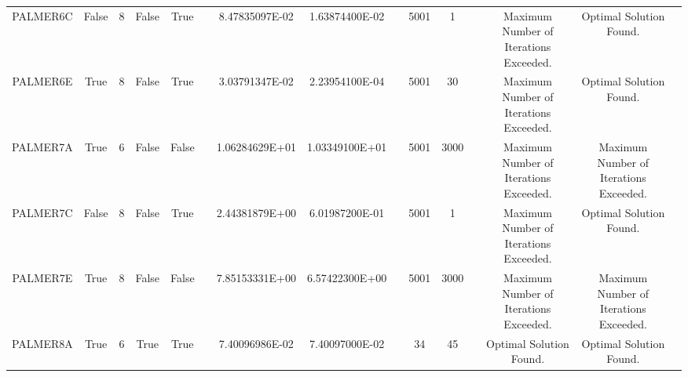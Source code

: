 \begin{longtable}{ccccccccccccccc}
	\cellcolor{default2} PALMER6C& \cellcolor{default2} False& \cellcolor{default2} 8& \cellcolor{default2} False& \cellcolor{default2} True& \cellcolor{header} & \cellcolor{poor} 8.47835097E-02& \cellcolor{best} 1.63874400E-02& \cellcolor{header} & \cellcolor{poor} 5001& \cellcolor{best} 1& \cellcolor{header} & \cellcolor{default2} Maximum Number of Iterations Exceeded.& \cellcolor{default2} Optimal Solution Found.& \cellcolor{header} \\
	\cellcolor{default1} PALMER6E& \cellcolor{default1} True& \cellcolor{default1} 8& \cellcolor{default1} False& \cellcolor{default1} True& \cellcolor{header} & \cellcolor{poor} 3.03791347E-02& \cellcolor{best} 2.23954100E-04& \cellcolor{header} & \cellcolor{poor} 5001& \cellcolor{best} 30& \cellcolor{header} & \cellcolor{default1} Maximum Number of Iterations Exceeded.& \cellcolor{default1} Optimal Solution Found.& \cellcolor{header} \\
	\cellcolor{default2} PALMER7A& \cellcolor{default2} True& \cellcolor{default2} 6& \cellcolor{default2} False& \cellcolor{default2} False& \cellcolor{header} & \cellcolor{poor} 1.06284629E+01& \cellcolor{best} 1.03349100E+01& \cellcolor{header} & \cellcolor{ok} 5001& \cellcolor{best} 3000& \cellcolor{header} & \cellcolor{default2} Maximum Number of Iterations Exceeded.& \cellcolor{default2} Maximum Number of Iterations Exceeded.& \cellcolor{header} \\
	\cellcolor{default1} PALMER7C& \cellcolor{default1} False& \cellcolor{default1} 8& \cellcolor{default1} False& \cellcolor{default1} True& \cellcolor{header} & \cellcolor{poor} 2.44381879E+00& \cellcolor{best} 6.01987200E-01& \cellcolor{header} & \cellcolor{poor} 5001& \cellcolor{best} 1& \cellcolor{header} & \cellcolor{default1} Maximum Number of Iterations Exceeded.& \cellcolor{default1} Optimal Solution Found.& \cellcolor{header} \\
	\cellcolor{default2} PALMER7E& \cellcolor{default2} True& \cellcolor{default2} 8& \cellcolor{default2} False& \cellcolor{default2} False& \cellcolor{header} & \cellcolor{poor} 7.85153331E+00& \cellcolor{best} 6.57422300E+00& \cellcolor{header} & \cellcolor{ok} 5001& \cellcolor{best} 3000& \cellcolor{header} & \cellcolor{default2} Maximum Number of Iterations Exceeded.& \cellcolor{default2} Maximum Number of Iterations Exceeded.& \cellcolor{header} \\
	\cellcolor{default1} PALMER8A& \cellcolor{default1} True& \cellcolor{default1} 6& \cellcolor{default1} True& \cellcolor{default1} True& \cellcolor{header} & \cellcolor{best} 7.40096986E-02& \cellcolor{ok} 7.40097000E-02& \cellcolor{header} & \cellcolor{best} 34& \cellcolor{ok} 45& \cellcolor{header} & \cellcolor{default1} Optimal Solution Found.& \cellcolor{default1} Optimal Solution Found.& \cellcolor{header} \\

\end{longtable}
